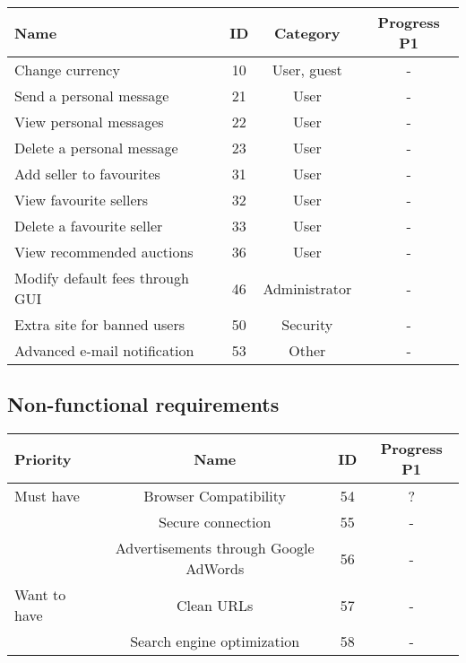 	\begin{tabular}{l|c c | c}
	  Name & ID & Category & Progress P1\\ 
	  \hline
	  Change currency & 10 & User, guest & -\\
	  Send a personal message & 21 & User & -\\
	  View personal messages & 22 & User & -\\
	  Delete a personal message & 23 & User & -\\
	  Add seller to favourites  & 31 & User & -\\
	  View favourite sellers & 32 & User & -\\
	  Delete a favourite seller & 33 & User & -\\
	  View recommended auctions & 36 & User & -\\
	  Modify default fees through GUI & 46 & Administrator & -\\
	  Extra site for banned users & 50 & Security & -\\
	  Advanced e-mail notification & 53 & Other & -
	\end{tabular}
	
	\subsection{Non-functional requirements}
	
	\begin{tabular}{l|c c | c}
	  Priority & Name & ID & Progress P1\\ 
	  \hline
	  Must have & Browser Compatibility & 54 & ?\\
	  & Secure connection & 55 & -\\
	  & Advertisements through Google AdWords & 56 & -\\
	  \hline
	  Want to have & Clean URLs & 57 & -\\
	  & Search engine optimization & 58 & -
	\end{tabular}
	
	  
	